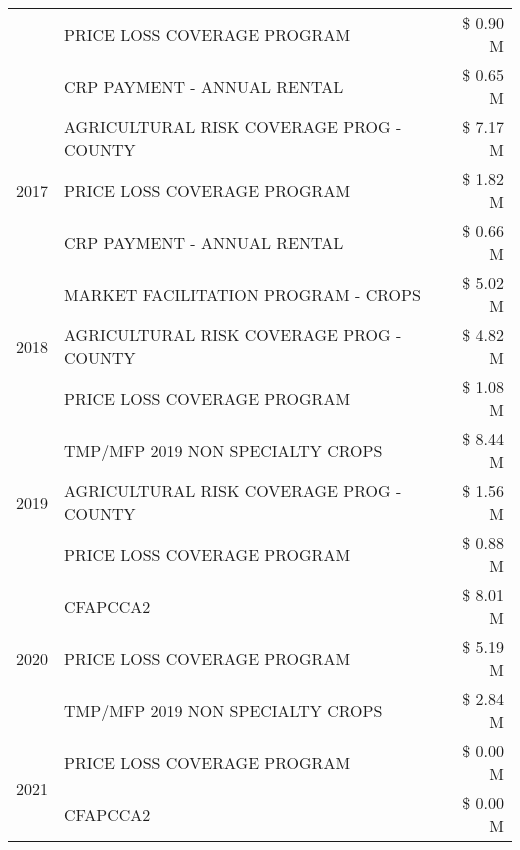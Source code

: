 \begin{tabular}{llr}
 & PRICE LOSS COVERAGE PROGRAM & \$ 0.90 M \\
 & CRP PAYMENT - ANNUAL RENTAL & \$ 0.65 M \\
\cline{1-3}
\multirow[t]{3}{*}{2017} & AGRICULTURAL RISK COVERAGE PROG - COUNTY & \$ 7.17 M \\
 & PRICE LOSS COVERAGE PROGRAM & \$ 1.82 M \\
 & CRP PAYMENT - ANNUAL RENTAL & \$ 0.66 M \\
\cline{1-3}
\multirow[t]{3}{*}{2018} & MARKET FACILITATION PROGRAM - CROPS & \$ 5.02 M \\
 & AGRICULTURAL RISK COVERAGE PROG - COUNTY & \$ 4.82 M \\
 & PRICE LOSS COVERAGE PROGRAM & \$ 1.08 M \\
\cline{1-3}
\multirow[t]{3}{*}{2019} & TMP/MFP 2019 NON SPECIALTY CROPS & \$ 8.44 M \\
 & AGRICULTURAL RISK COVERAGE PROG - COUNTY & \$ 1.56 M \\
 & PRICE LOSS COVERAGE PROGRAM & \$ 0.88 M \\
\cline{1-3}
\multirow[t]{3}{*}{2020} & CFAPCCA2 & \$ 8.01 M \\
 & PRICE LOSS COVERAGE PROGRAM & \$ 5.19 M \\
 & TMP/MFP 2019 NON SPECIALTY CROPS & \$ 2.84 M \\
\cline{1-3}
\multirow[t]{2}{*}{2021} & PRICE LOSS COVERAGE PROGRAM & \$ 0.00 M \\
 & CFAPCCA2 & \$ 0.00 M \\
\cline{1-3}
\bottomrule
\end{tabular}
